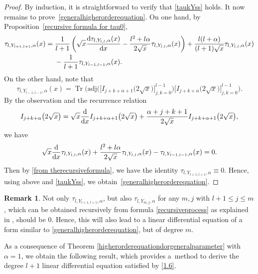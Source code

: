 \documentclass[pdftex]{sigma}
\numberwithin{equation}{section}
\theoremstyle{definition}
\newtheorem{Remark}[Theorem]{Remark}
\begin{document}
\begin{proof}
By induction, it is straightforward to verify that \eqref{taukYss} holds. It now remains to prove~\eqref{generalhigherorderequation}. On one hand, by Proposition~\ref{recursive formula for tau0},
\begin{align}
\tau_{l,Y_{l+1,l+1},\alpha}(x) ={}& \frac{1}{l+1} \left(\sqrt{x} \frac{{\rm d}\tau_{l,Y_{l,l},\alpha}(x)}{{\rm d}x} - \frac{l^2+l\alpha}{2\sqrt{x}}\tau_{l,Y_{l,l},\alpha}(x) \right) + \frac{l(l+\alpha)}{(l+1)\sqrt{x}} \tau_{l,Y_{l,l},\alpha}(x)\nonumber\\
&-\frac{1}{l+1} \tau_{l,Y_{l-1,l-1},\alpha}(x)\label{from therecursiveformula} .
\end{align}
On the other hand, note that
\begin{equation*}
\tau_{l,Y_{l-1,l-1},\alpha}(x)=\operatorname{Tr}\bigl(\mathrm{adj}\bigl(\big[I_{j+k+\alpha+1}\bigl(2\sqrt{x}\bigr)\big]_{j,k=0}^{ l-1}\bigr)\big[I_{j+k+\alpha}\bigl(2\sqrt{x}\bigr) \big]_{j,k=0}^{ l-1}\bigr).
\end{equation*}
By the observation 
and the recurrence relation
\begin{equation*}
I_{j+k+\alpha}\bigl(2\sqrt{x}\bigr)
=\sqrt{x} \frac{\rm d}{{\rm d}x} I_{j+k+\alpha+1}\bigl(2\sqrt{x}\bigr) + \frac{\alpha+j+k+1}{2\sqrt{x}} I_{j+k+\alpha+1}\bigl(2\sqrt{x}\bigr) ,
\end{equation*}
we have
\begin{equation*}
\sqrt{x} \frac{\rm d}{{\rm d}x} \tau_{l,Y_{l,l},\alpha}(x) + \frac{l^2+l\alpha}{2\sqrt{x}} \tau_{l,Y_{l,l},\alpha}(x)
-\tau_{l,Y_{l-1,l-1},\alpha}(x) = 0.
\end{equation*}
Then by \eqref{from therecursiveformula}, we have the identity
$
\tau_{l,Y_{l+1,l+1},\alpha}\equiv 0$.
Hence, using above and \eqref{taukYss}, we obtain~\eqref{generalhigherorderequation}.
\end{proof}
\begin{Remark}
Not only $\tau_{l,Y_{l+1,l+1},\alpha}$, but also $\tau_{l,Y_{m,j},\alpha}$ for any $m,j$ with $l+1 \leq j \leq m$, which can be obtained recursively from formula \eqref{recursiveprocess} as explained in \cite[Remark~3.5]{KW24b}, should be $0$. Hence, this will also lead to a linear differential equation of a form similar to \eqref{generalhigherorderequation}, but of degree $m$.
\end{Remark}
As a consequence of Theorem \ref{higherorderequationdorgeneralparameter} with $\alpha=1$, we obtain the following result, which provides a~method to derive the degree $l+1$ linear differential equation satisfied by \eqref{1.6}.
\end{document}
